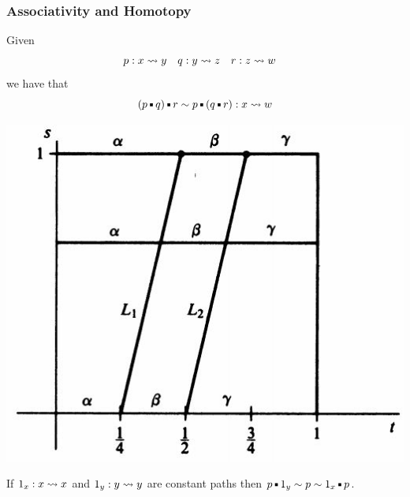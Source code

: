 \documentclass{beamer} %
\begin{document}

\begin{frame}
  \frametitle{Associativity and Homotopy}
  \small
  Given 
  \begin{align*}
    p &: x \rightsquigarrow y
    &
    q &: y \rightsquigarrow z
    &
    r &: z \rightsquigarrow w
  \end{align*}
  we have that
  \[
    (p \Concat q) \Concat r \sim p \Concat (q \Concat r) : x \Path w
  \]

  \begin{center}
    \includegraphics[scale=0.3]{assoc.jpg}
  \end{center}
  
  If $1_x : x \rightsquigarrow x$ and $1_y : y \rightsquigarrow y$ are constant paths then
  $
    p \Concat 1_y \sim p \sim 1_x \Concat p
  $.
\end{frame}
\end{document}
